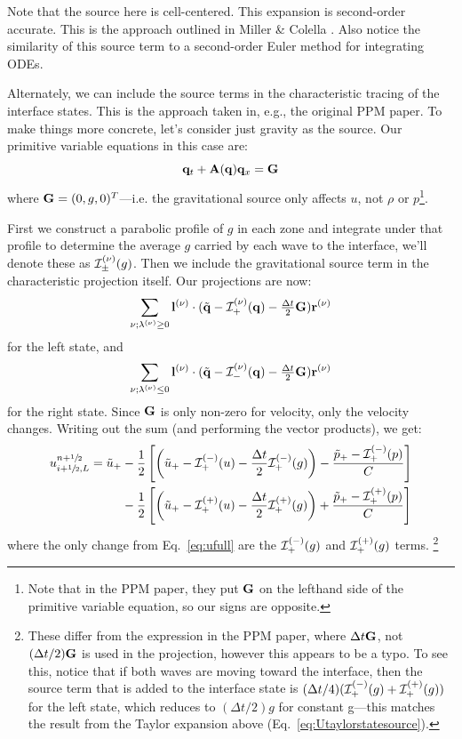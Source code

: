 Note that the source here is cell-centered.  This expansion is
second-order accurate.  This is the approach outlined in Miller
\& Colella \cite{millercolella:2002}.  Also notice the 
similarity of this source term to a second-order Euler method
for integrating ODEs.

Alternately, we can include the source terms in the characteristic
tracing of the interface states.  This is the approach taken in, e.g.,
the original PPM paper.  To make things more concrete, let's consider just
gravity as the source.  Our primitive variable equations in this case are:
\begin{equation}
{\bf q}_t + {\bf A}({\bf q}) {\bf q}_x = {\bf G}
\end{equation}
where ${\bf G} = (0, g, 0)^T$---i.e. the gravitational source only affects
$u$, not $\rho$ or $p$\footnote{Note that in the PPM paper, they put ${\bf G}$ on
the lefthand side of the primitive variable equation, so our signs are
opposite.}.

First we construct a parabolic profile of $g$ in each zone and
integrate under that profile to determine the average $g$ carried by
each wave to the interface, we'll denote these as ${\mathcal{I}}^{(\nu)}_\pm(g)$.  Then we include the gravitational source
term in the characteristic projection itself.  Our projections are
now:
\begin{equation}
\sum_{\nu; \lambda^{(\nu)} \ge 0}{\bf l}^{(\nu)} \cdot (\tilde{{\bf q}} - {\mathcal{I}}^{(\nu)}_+({\bf q}) - \tfrac{\Delta t}{2} {\bf G}) {\bf r}^{(\nu)}
\end{equation}
for the left state, and
\begin{equation}
\sum_{\nu; \lambda^{(\nu)} \le 0} {\bf l}^{(\nu)} \cdot (\tilde{{\bf q}} - {\mathcal{I}}^{(\nu)}_-({\bf q}) - \tfrac{\Delta t}{2} {\bf G}) {\bf r}^{(\nu)}
\end{equation}
for the right state.  Since ${\bf G}$ is only non-zero for velocity, only
the velocity changes.  Writing out the sum (and performing the vector products), we
get:
\begin{align}
u_{i+{\sfrac{1}{2}},L}^{n+{\sfrac{1}{2}}} =
   \tilde{u}_+
  &- \frac{1}{2} \left [
      \left (\tilde{u}_+ - {\mathcal{I}}_+^{(-)}(u) - \frac{\Delta t}{2} {\mathcal{I}}^{(-)}_+(g) \right ) -
       \frac{\tilde{p}_+ - {\mathcal{I}}_+^{(-)}(p)}{C} \right ] \nonumber \\
  &- \frac{1}{2} \left [
      \left (\tilde{u}_+ - {\mathcal{I}}_+^{(+)}(u) - \frac{\Delta t}{2} {\mathcal{I}}^{(+)}_+(g) \right ) +
       \frac{\tilde{p}_+ - {\mathcal{I}}_+^{(+)}(p)}{C} \right ]
\end{align}
where the only change from Eq.~\ref{eq:ufull} are the
${\mathcal{I}}^{(-)}_+(g)$ and ${\mathcal{I}}^{(+)}_+(g)$ terms.
\footnote{These differ from the expression in the PPM paper, where $\Delta t {\bf G}$,
not $(\Delta t/2) {\bf G}$ is used in the projection, however this appears to
be a typo.  To see this, notice that if both waves are moving toward
the interface, then the source term that is added to the interface
state is $(\Delta t/4) ({\mathcal{I}}_+^{(-)}(g) +
{\mathcal{I}}_+^{(+)}(g))$ for the left state, which reduces to $(\Delta
t/2) g$ for constant g---this matches the result from the Taylor
expansion above (Eq.~\ref{eq:Utaylorstatesource}).}

